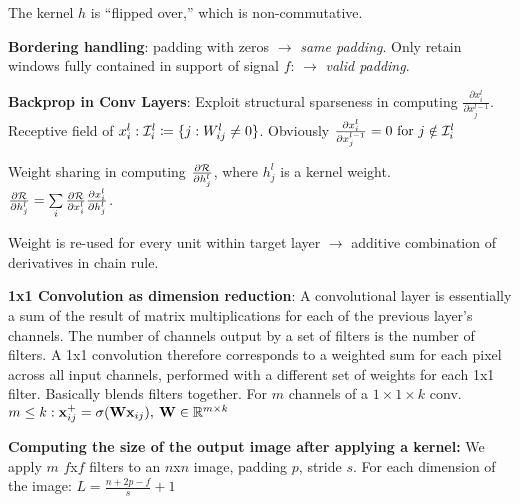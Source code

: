     The kernel $h$ is ``flipped over,'' which is non-commutative.
    
    \textbf{Bordering handling}: padding with zeros $\xrightarrow{}$ \emph{same padding}. Only retain windows fully contained in support of signal $f$: $\xrightarrow{}$ \emph{valid padding}.
    
    \textbf{Backprop in Conv Layers}: Exploit structural sparseness in computing $\frac{\partial x^l_i}{\partial x^{l-1}_j}$. Receptive field of $x^l_i:\mathcal{I}^l_i\coloneqq\{j:W^l_{ij}\neq0\}$. Obviously $\frac{\partial x^l_i}{\partial x^{l-1}_j}=0 \text{ for } j\notin\mathcal{I}^l_i$
    
    Weight sharing in computing $\frac{\partial\mathcal{R}}{\partial h^l_j}$, where $h^l_j$ is a kernel weight. \\
    \tab$\frac{\partial\mathcal{R}}{\partial h^l_j}=\sum\limits_i\frac{\partial\mathcal{R}}{\partial x^l_i}\frac{\partial x^l_i}{\partial h^l_j}$.
    
    Weight is re-used for every unit within target layer $\xrightarrow{}$ additive combination of derivatives in chain rule.
    
    \textbf{1x1 Convolution as dimension reduction}: A convolutional layer is essentially a sum of the result of matrix multiplications for each of the previous layer's channels. The number of channels output by a set of filters is the number of filters. A 1x1 convolution therefore corresponds to a weighted sum for each pixel across all input channels, performed with a different set of weights for each 1x1 filter. Basically blends filters together. For $m$ channels of a $1\times1\times k$ conv. $m\leq k:\mathbf x^+_{ij}=\sigma(\mathbf W\mathbf x_{ij}),\>\mathbf W\in\mathbb R^{m\times k}$ 
    
    \textbf{Computing the size of the output image after applying a kernel:} We apply $m$ $f$x$f$ filters to an $n$x$n$ image, padding $p$, stride $s$. For each dimension of the image: $L=\frac{n+2p-f}{s}+1$
